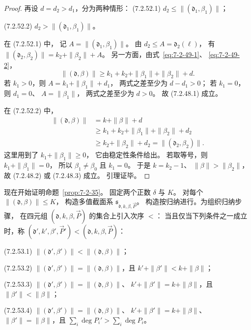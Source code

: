 \begin{proof}
再设 $d=d_2>d_1$，分为两种情形：
\noindent\textup{(7.2.52.1)}\quad
$d_2\le\|(\mathfrak d_1,\beta_1)\|$；

\noindent\textup{(7.2.52.2)}\quad
$d_2>\|(\mathfrak d_1,\beta_1)\|$。

在 (7.2.52.1) 中，
记 $A=\|(\mathfrak d_1,\beta_1)\|$。
由 $d_2\le A=\mathfrak d_2(\ell)$，
有
$\|(\mathfrak d_2,\beta_2)\|
=k_2+\|\beta_2\|+A$。
另一方面，由式~\eqref{eq:7-2-49-1}、
\eqref{eq:7-2-49-2}，
\[
\|(\mathfrak d,\beta)\|
\ge k_1+k_2+\|\beta_1\|+\|\beta_2\|+d.
\]
若 $k_1>0$，则
$A=k_1+\|\beta_1\|+d_1$，
两式之差至少为 $d-d_1>0$；
若 $k_1=0$，则 $d_1=0$、
$A=\|\beta_1\|$，
两式之差至少为 $d>0$。
故 (7.2.48.1) 成立。

在 (7.2.52.2) 中，
\[
\begin{aligned}
\|(\mathfrak d,\beta)\|
&=k+\|\beta\|+d\\
&\ge k_1+k_2+\|\beta_1\|+\|\beta_2\|+d_2\\
&\ge k_2+\|\beta_2\|+d_2
=\|(\mathfrak d_2,\beta_2)\|.
\end{aligned}
\]
这里用到了 $k_1+\|\beta_1\|\ge0$，
它由稳定性条件给出。
若取等号，则 $k_1+\|\beta_1\|=0$，
所以 $\beta_1\ne\beta_0$ 且 $k_1=0$。
于是 $k=k_2-1$、
$\|\beta\|>\|\beta_2\|$，
故 (7.2.48.2) 或 (7.2.48.3) 成立。
引理证毕。
\end{proof}

现在开始证明命题~\ref{prop:7-2-35}。
固定两个正数 $\delta$ 与 $K$。
对每个 $\|(\mathfrak d,\beta)\|\le K$，
构造多值截面系
$\mathfrak s_{\mathfrak d,k,\beta,\vec P}$。
构造按归纳进行。为组织归纳步骤，
在四元组 $(\mathfrak d,k,\beta,\vec P)$
的集合上引入次序 $<$：
当且仅当下列条件之一成立时，称
$(\mathfrak d',k',\beta',\vec P')
<(\mathfrak d,k,\beta,\vec P)$：

\noindent\textup{(7.2.53.1)}\quad
$\|(\mathfrak d',\beta')\|
<\|(\mathfrak d,\beta)\|$；

\noindent\textup{(7.2.53.2)}\quad
$\|(\mathfrak d',\beta')\|
=\|(\mathfrak d,\beta)\|$，且
$k'+\|\beta'\|<k+\|\beta\|$；

\noindent\textup{(7.2.53.3)}\quad
$\|(\mathfrak d',\beta')\|
=\|(\mathfrak d,\beta)\|$、
$k'+\|\beta'\|=k+\|\beta\|$，且
$\|\beta'\|<\|\beta\|$；

\noindent\textup{(7.2.53.4)}\quad
$\|(\mathfrak d',\beta')\|
=\|(\mathfrak d,\beta)\|$、
$k'+\|\beta'\|=k+\|\beta\|$、
$\|\beta'\|=\|\beta\|$，且
$\sum_i\deg P_i'>\sum_i\deg P_i$。


